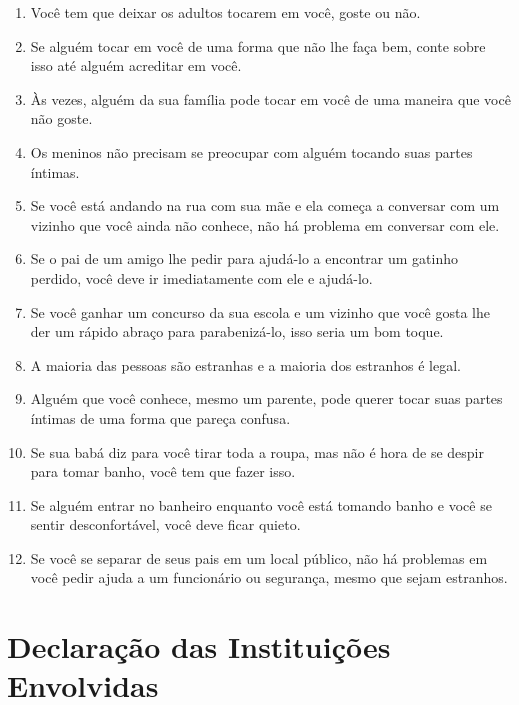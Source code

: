 \begin{apendicesenv}
\begin{enumerate}
	\item Você tem que deixar os adultos tocarem em você, goste ou não.
	\item Se alguém tocar em você de uma forma que não lhe faça bem, conte sobre isso até alguém acreditar em você.
	\item Às vezes, alguém da sua família pode tocar em você de uma maneira que você não goste.
	\item Os meninos não precisam se preocupar com alguém tocando suas partes íntimas.
	\item Se você está andando na rua com sua mãe e ela começa a conversar com um vizinho que você ainda não conhece, não há problema em conversar com ele.
	\item Se o pai de um amigo lhe pedir para ajudá-lo a encontrar um gatinho perdido, você deve ir imediatamente com ele e ajudá-lo.
	\item Se você ganhar um concurso da sua escola e um vizinho que você gosta lhe der um rápido abraço para parabenizá-lo, isso seria um bom toque.
	\item A maioria das pessoas são estranhas e a maioria dos estranhos é legal.
	\item Alguém que você conhece, mesmo um parente, pode querer tocar suas partes íntimas de uma forma que pareça confusa.
	\item Se sua babá diz para você tirar toda a roupa, mas não é hora de se despir para tomar banho, você tem que fazer isso.
	\item Se alguém entrar no banheiro enquanto você está tomando banho e você se sentir desconfortável, você deve ficar quieto.
	\item Se você se separar de seus pais em um local público, não há problemas em você pedir ajuda a um funcionário ou segurança, mesmo que sejam estranhos.
\end{enumerate}


%


\chapter{Declaração das Instituições Envolvidas}\label{chap:DIE}


\end{apendicesenv}
